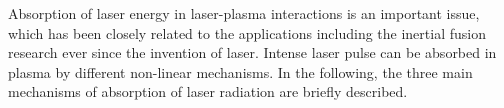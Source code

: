 Absorption of laser energy in laser-plasma interactions is an important issue, which has been closely related to the applications including the inertial fusion research ever since the invention of laser. Intense laser pulse can be absorbed in plasma by different non-linear mechanisms. In the following, the three main mechanisms of absorption of laser radiation are briefly described.
